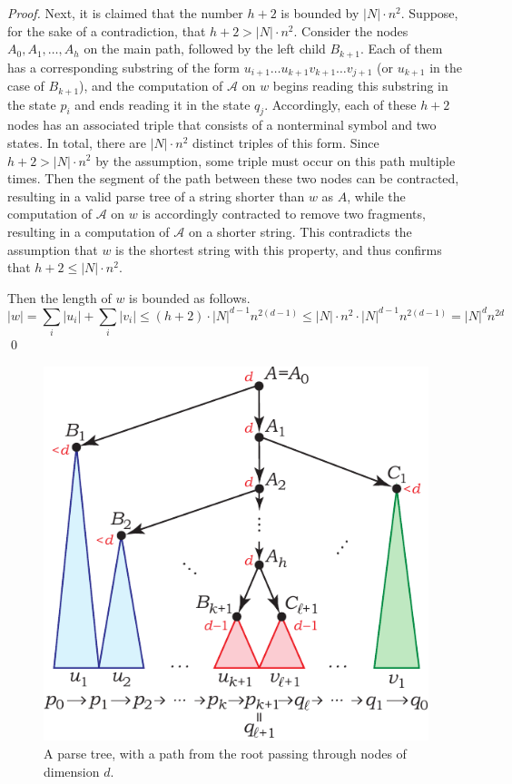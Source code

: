 \documentclass[runningheads]{llncs}
\begin{document}
\begin{proof}
Next, it is claimed that the number $h+2$
is bounded by $|N| \cdot n^2$.
Suppose, for the sake of a contradiction,
that $h+2 > |N| \cdot n^2$.
Consider the nodes $A_0, A_1, \ldots, A_h$ on the main path,
followed by the left child $B_{k+1}$.
Each of them has a corresponding substring of the form $u_{i+1} \ldots u_{k+1} v_{k+1} \ldots v_{j+1}$
(or $u_{k+1}$ in the case of $B_{k+1}$),
and the computation of $\mathcal{A}$ on $w$
begins reading this substring in the state $p_i$ and ends reading it in the state $q_j$.
Accordingly, each of these $h+2$ nodes
has an associated triple that consists of a nonterminal symbol and two states.
In total, there are $|N| \cdot n^2$ distinct triples of this form.
Since $h+2 > |N| \cdot n^2$ by the assumption,
some triple must occur on this path multiple times.
Then the segment of the path between these two nodes can be contracted,
resulting in a valid parse tree of a string shorter than $w$ as $A$,
while the computation of $\mathcal{A}$ on $w$
is accordingly contracted to remove two fragments,
resulting in a computation of $\mathcal{A}$ on a shorter string.
This contradicts the assumption
that $w$ is the shortest string with this property,
and thus confirms that $h+2 \leqslant |N| \cdot n^2$.

Then the length of $w$ is bounded as follows.
\begin{equation*}
	|w|
		=
	\sum_i |u_i| + \sum_i |v_i|
		\leqslant
	(h+2) \cdot |N|^{d-1} n^{2(d-1)}
		\leqslant
	|N| \cdot n^2 \cdot |N|^{d-1} n^{2(d-1)}
		=
	|N|^d n^{2d}
\end{equation*}
\qed
\end{proof}

\begin{figure}[t]
	\centering
	\includegraphics[scale=0.9]{pictures/rational_index_upper_bound}
	\caption{A parse tree, with a path from the root passing through nodes of dimension $d$.}
	\label{dimupper}
\end{figure}
\end{document}
